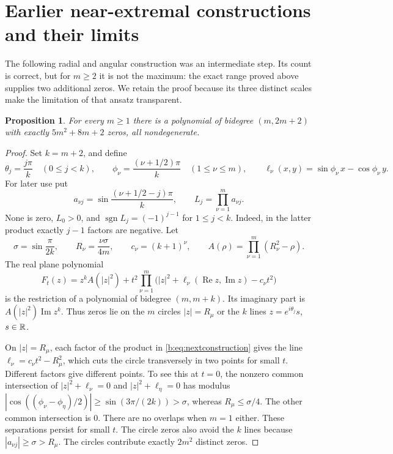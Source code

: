 \documentclass[UTF8,11pt]{ctexart}
\newtheorem{prop}[thm]{Proposition}
\theoremstyle{definition}
\numberwithin{equation}{section}
\DeclareMathOperator{\Rea}{Re}\DeclareMathOperator{\Ima}{Im}
\DeclareMathOperator{\sgn}{sgn}\DeclareMathOperator{\wind}{wind}
\begin{document}
\section{Earlier near-extremal constructions and their limits}\label{core:near}
The following radial and angular construction was an intermediate step.
Its count is correct, but for $m\ge2$ it is not the maximum: the exact
range proved above supplies two additional zeros. We retain the proof
because its three distinct scales make the limitation of that ansatz
transparent.
\begin{prop}\label{b:prop:nextdiagonal}
For every $m\ge1$ there is a polynomial of bidegree $(m,2m+2)$
with exactly $5m^2+8m+2$ zeros, all nondegenerate.
\end{prop}
\begin{proof}
Set $k=m+2$, and define
\[
 \theta_j=\frac{j\pi}{k}\quad(0\le j<k),\qquad
 \phi_\nu=\frac{(\nu+1/2)\pi}{k}\quad(1\le\nu\le m),
 \qquad
 \ell_\nu(x,y)=\sin\phi_\nu\,x-\cos\phi_\nu\,y.
\]
For later use put
\begin{equation}\label{b:eq:linesigns}
 a_{\nu j}=\sin\frac{(\nu+1/2-j)\pi}{k},\qquad
 L_j=\prod_{\nu=1}^m a_{\nu j}.
\end{equation}
None is zero, $L_0>0$, and $\sgn L_j=(-1)^{j-1}$ for $1\le j<k$.
Indeed, in the latter product exactly $j-1$ factors are negative.
Let
\[
 \sigma=\sin\frac\pi{2k},\qquad
 R_\nu=\frac{\nu\sigma}{4m},\qquad c_\nu=(k+1)^\nu,
 \qquad A(\rho)=\prod_{\nu=1}^m(R_\nu^2-\rho).
\]
The real plane polynomial
\begin{equation}\label{b:eq:nextconstruction}
 F_t(z)=z^kA(|z|^2)+t^2
 \prod_{\nu=1}^m\bigl(|z|^2+\ell_\nu(\Rea z,\Ima z)-c_\nu t^2\bigr)
\end{equation}
is the restriction of a polynomial of bidegree $(m,m+k)$.
Its imaginary part is $A(|z|^2)\Ima z^k$. Thus zeros lie on the
$m$ circles $|z|=R_\mu$ or the $k$ lines $z=e^{i\theta_j}s$,
$s\in\mathbb R$.

On $|z|=R_\mu$, each factor of the product in
\eqref{b:eq:nextconstruction} gives the line
$\ell_\nu=c_\nu t^2-R_\mu^2$, which cuts the circle transversely
in two points for small $t$. Different factors give different points.
To see this at $t=0$, the nonzero common intersection of
$|z|^2+\ell_\nu=0$ and $|z|^2+\ell_\eta=0$ has modulus
$|\cos((\phi_\nu-\phi_\eta)/2)|\ge\sin(3\pi/(2k))>\sigma$,
whereas $R_\mu\le\sigma/4$. The other common intersection is $0$.
There are no overlaps when $m=1$ either. These separations persist
for small $t$. The circle zeros also avoid the $k$ lines because
$|a_{\nu j}|\ge\sigma>R_\mu$. The circles contribute exactly
$2m^2$ distinct zeros.


\end{proof}
\end{document}
